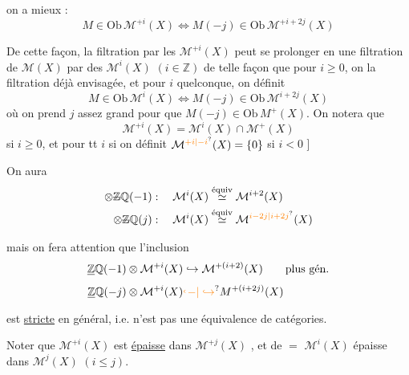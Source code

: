 on a mieux : %
\[
M\in\mathrm{Ob}\,\mathcal M^{+i}(X)\Longleftrightarrow M(-j)\in\mathrm{Ob}\,\mathcal M^{+i+2j}(X) %
\]

De cette façon, la filtration  par les %
$\mathcal M^{+i}(X)$  peut se prolonger en une filtration %
de $\mathcal M(X)$ par des $\mathcal M^i(X)$ $(i\in\mathbb Z)$ de %
telle façon que pour $i\geq0$, on  la filtration %
déjà  envisagée, et pour $i$ quelconque, %
on définit %
\[
M\in\mathrm{Ob}\,\mathcal M^i(X)\Longleftrightarrow M(-j)\in\mathrm{Ob}\,\mathcal M^{i+2j}(X) %
\]
où on prend $j$ assez grand pour que %
$M(-j)\in\mathrm{Ob}\,M^+(X)$. On notera que %
\[
\mathcal M^{+i}(X)=\mathcal M^i(X)\cap\mathcal M^+(X) %
\]
si $i\geq0$, et pour tt $i$ si on définit %
$\mathcal M^{\unsure{+i|-i}}(X)=\{0\}$ si $i<0$ ] %

On aura %
\[
\begin{aligned}
\otimes\deleted{\mathbb Z}\mathbb Q(-1)&:\quad\mathcal M^i(X)\overset{\text{équiv}}{\simeq}\mathcal M^{i+2}(X)\\ %
\otimes\deleted{\mathbb Z}\mathbb Q(j)&:\quad\mathcal M^i(X)\overset{\text{équiv}}{\simeq}\mathcal M^{\unsure{i-2j|i+2j}}(X) %
\end{aligned}
\]

mais on fera attention que l'inclusion %
\[
\begin{aligned}
\deleted{\mathbb Z}\mathbb Q(-1)\otimes\mathcal M^{+i}(X)&\hookrightarrow\mathcal M^{+(i+2)}(X)\qquad\text{plus gén.}\\ %
\deleted{\mathbb Z}\mathbb Q(-j)\otimes\mathcal M^{+i}(X)&\unsure{\lhook\joinrel-|\hookrightarrow}M^{+(i+2j)}(X) %
\end{aligned}
\]
est \uline{stricte} en général, i.e. n'est pas %
une équivalence de catégories. %

Noter que $\mathcal M^{+i}(X)$ est \uline{épaisse} dans $\mathcal M^{+j}(X)$ %
\deleted{[elle est définie, dans la catégorie}, et de %
$=$ $\mathcal M^i(X)$ épaisse dans $\mathcal M^j(X)$ $(i\leq j)$. %

